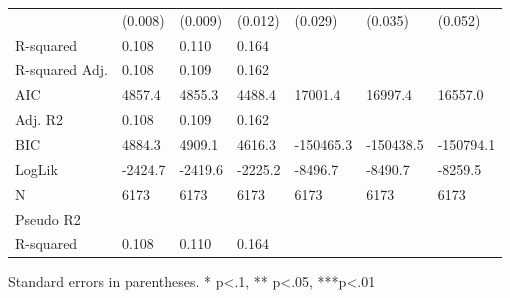 \begin{table}
\begin{center}
\begin{tabular}{lllllll}
                   & (0.008)   & (0.009)   & (0.012)   & (0.029)   & (0.035)   & (0.052)    \\
R-squared          & 0.108     & 0.110     & 0.164     &           &           &            \\
R-squared Adj.     & 0.108     & 0.109     & 0.162     &           &           &            \\
AIC                & 4857.4    & 4855.3    & 4488.4    & 17001.4   & 16997.4   & 16557.0    \\
Adj. R2            & 0.108     & 0.109     & 0.162     &           &           &            \\
BIC                & 4884.3    & 4909.1    & 4616.3    & -150465.3 & -150438.5 & -150794.1  \\
LogLik             & -2424.7   & -2419.6   & -2225.2   & -8496.7   & -8490.7   & -8259.5    \\
N                  & 6173      & 6173      & 6173      & 6173      & 6173      & 6173       \\
Pseudo R2          &           &           &           &           &           &            \\
R-squared          & 0.108     & 0.110     & 0.164     &           &           &            \\
\hline
\end{tabular}
\end{center}
\end{table}
\bigskip
Standard errors in parentheses. \newline 
* p<.1, ** p<.05, ***p<.01